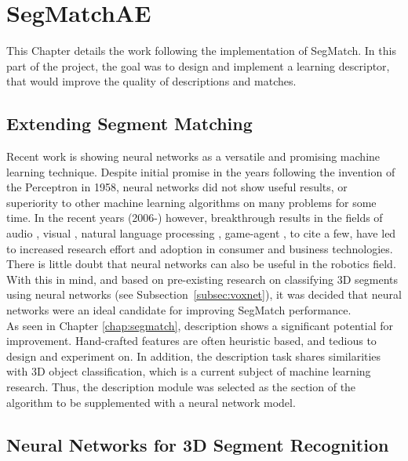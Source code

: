 \chapter{SegMatchAE}
\label{chap:ae}

This Chapter details the work following the implementation of SegMatch. In this part of the project, the goal was to design and implement a learning descriptor, that would improve the quality of descriptions and matches.\\

\section{Extending Segment Matching}
\label{sec:ae-intro}

Recent work is showing neural networks as a versatile and promising machine learning technique. Despite initial promise in the years following the invention of the Perceptron \cite{perceptron} in 1958, neural networks did not show useful results, or superiority to other machine learning algorithms on many problems for some time. In the recent years (2006-) however, breakthrough results in the fields of audio \cite{wavenet}, visual \cite{inception}, natural language processing \cite{nlp}, game-agent \cite{alphago}, to cite a few, have led to increased research effort and adoption in consumer and business technologies.\\

There is little doubt that neural networks can also be useful in the robotics field. With this in mind, and based on pre-existing research on classifying 3D segments using neural networks (see Subsection~\ref{subsec:voxnet}), it was decided that neural networks were an ideal candidate for improving SegMatch performance.\\

As seen in Chapter \ref{chap:segmatch}, description shows a significant potential for improvement. Hand-crafted features are often heuristic based, and tedious to design and experiment on. In addition, the description task shares similarities with 3D object classification, which is a current subject of machine learning research. Thus, the description module was selected as the section of the algorithm to be supplemented with a neural network model.\\

\section{Neural Networks for 3D Segment Recognition}
\label{sec:neural-nets}

